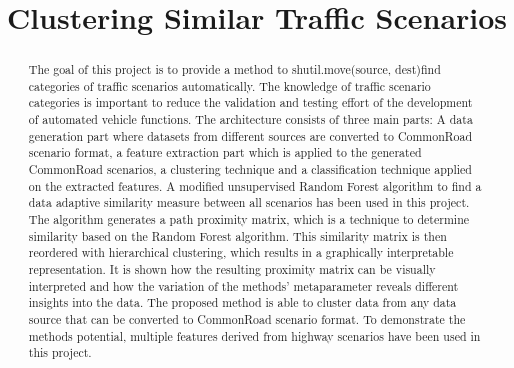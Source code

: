 \documentclass[conference]{IEEEtran}
\begin{document}

\newcommand{\algorithmautorefname}{Algorithm}
%
\title{Clustering Similar Traffic Scenarios}

\author{
}

\maketitle

\begin{abstract}
The goal of this project is to provide a method to shutil.move(source, dest)find categories of traffic scenarios automatically. The knowledge of traffic scenario categories is important to reduce the validation and testing effort of the development of automated vehicle functions. The architecture consists of three main parts: A data generation part where datasets from different sources are converted to CommonRoad scenario format, a feature extraction part which is applied to the generated CommonRoad scenarios, a clustering technique and a classification technique applied on the extracted features. A modified unsupervised Random Forest algorithm to find a data adaptive similarity measure between all scenarios has been used in this project. The algorithm generates a path proximity matrix, which is a technique to determine similarity based on the Random Forest algorithm. This similarity matrix is then reordered with hierarchical clustering, which results in a graphically interpretable representation. It is shown how the resulting proximity matrix can be visually interpreted and how the variation of the methods' metaparameter reveals different insights into the data. The proposed method is able to cluster data from any data source that can be converted to CommonRoad scenario format. To demonstrate the methods potential, multiple features derived from highway scenarios have been used in this project.
\end{abstract}
%
\IEEEpeerreviewmaketitle
\end{document}
